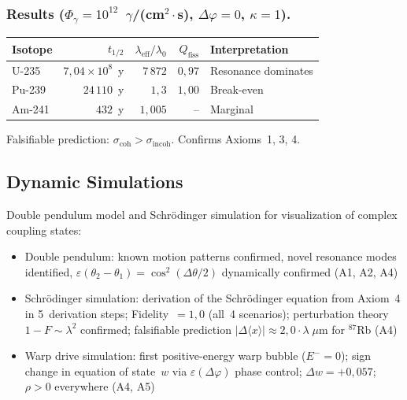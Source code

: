 \documentclass[a4paper,11pt]{article}
\begin{document}
	\subsubsection{Results
		($\Phi_\gamma = 10^{12}$~$\gamma$/(cm$^2 \cdot$s),
		$\Delta\varphi = 0$, $\kappa = 1$).}
	
	\begin{center}
		\begin{tabular}{lrrrl}
			\hline
			\textbf{Isotope} & $t_{1/2}$
			& $\lambda_{\mathrm{eff}}/\lambda_0$
			& $Q_{\mathrm{fiss}}$ & \textbf{Interpretation} \\
			\hline
			U-235 & $7{,}04 \times 10^8$~y & $7\,872$
			& $0{,}97$ & Resonance dominates \\
			Pu-239 & $24\,110$~y & $1{,}3$
			& $1{,}00$ & Break-even \\
			Am-241 & $432$~y & $1{,}005$
			& -- & Marginal \\
			\hline
		\end{tabular}
	\end{center}
	
	Falsifiable prediction:
	$\sigma_{\mathrm{coh}} > \sigma_{\mathrm{incoh}}$.
	Confirms Axioms~1, 3, 4.
	
	\subsection{Dynamic Simulations}
	
	Double pendulum model and Schr\"odinger simulation
	for visualization of complex coupling states:
	\begin{itemize}
		\item Double pendulum: known motion patterns
		confirmed, novel resonance modes identified,
		$\varepsilon(\theta_2-\theta_1) = \cos^2(\Delta\theta/2)$
		dynamically confirmed (A1, A2, A4)
		\item Schr\"odinger simulation: derivation of the
		Schr\"odinger equation from Axiom~4 in
		5~derivation steps; Fidelity~$= 1{,}0$ (all~4
		scenarios); perturbation theory
		$1-F \sim \lambda^2$ confirmed; falsifiable
		prediction $|\Delta\langle x\rangle| \approx
		2{,}0 \cdot \lambda\;\mu$m for ${}^{87}$Rb (A4)
		\item Warp drive simulation: first positive-energy
		warp bubble ($E^- = 0$);
		sign change in equation of state~$w$ via
		$\varepsilon(\Delta\varphi)$ phase control;
		$\Delta w = +0{,}057$; $\rho > 0$ everywhere (A4, A5)
	\end{itemize}
	
\end{document}
